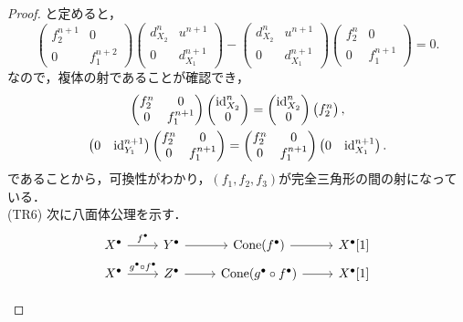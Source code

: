 \begin{proof}
	と定めると，
	\[\begin{pmatrix}f_2^{n+1}&0\\ 0& f_1^{n+2}\end{pmatrix}\begin{pmatrix}d_{X_2}^n & u^{n+1}\\ 0& d_{X_1}^{n+1}\end{pmatrix}- \begin{pmatrix}d_{X_2}^n & u^{n+1}\\ 0& d_{X_1}^{n+1}\end{pmatrix}\begin{pmatrix}f_2^{n}&0\\ 0& f_1^{n+1}\end{pmatrix}= 0.\]
	なので，複体の射であることが確認でき，
	\begin{gather*}
	\begin{pmatrix}f_2^{n}&0\\ 0& f_1^{n+1}\end{pmatrix}\begin{pmatrix}\mathrm{id}_{X_2}^n\\ 0\end{pmatrix}= \begin{pmatrix}\mathrm{id}_{X_2}^n\\ 0\end{pmatrix}\begin{pmatrix}f_2^n\end{pmatrix},\\
	\begin{pmatrix}0 & \mathrm{id}_{Y_1}^{n+1} \end{pmatrix}\begin{pmatrix}f_2^{n}&0\\ 0& f_1^{n+1}\end{pmatrix}= \begin{pmatrix}f_2^{n}&0\\ 0& f_1^{n+1}\end{pmatrix}\begin{pmatrix}0 & \mathrm{id}_{X_1}^{n+1} \end{pmatrix}.
\end{gather*}
であることから，可換性がわかり，$(f_1,f_2,f_3)$が完全三角形の間の射になっている．\\
(TR6) 次に八面体公理を示す．			\[
				\begin{tikzcd}[row sep=5pt]
			X^\bullet \ar[r,"f^\bullet"]& Y^\bullet\ar[r]& \Cone(f^\bullet) \ar[r]& X^\bullet[1]\\
			X^\bullet \ar[r,"g^\bullet\circ f^\bullet"]& Z^\bullet\ar[r]& \Cone( g^\bullet \circ f^\bullet) \ar[r]& X^\bullet[1]\\

\end{tikzcd}\]
\end{proof}
